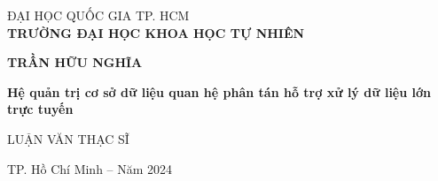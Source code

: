 \documentclass[14pt]{article}
\begin{document}
   
    




    \begin{mdframed}[linewidth=1pt, %
                     linecolor=black, %
                     leftmargin=0, %
                     rightmargin=0, %
                     innertopmargin=20mm, %
                     innerbottommargin=20mm, %
                     innerleftmargin=25mm, %
                     innerrightmargin=25mm, %
                     skipabove=0, %
                     skipbelow=0] %
    \centering
    \vspace*{1cm}
    
    \Large ĐẠI HỌC QUỐC GIA TP. HCM\\
    \vspace{0.25cm}
    \Large \textbf{TRƯỜNG ĐẠI HỌC KHOA HỌC TỰ NHIÊN}\\
    
    \vspace{3cm}
    
    \Large \textbf{TRẦN HỮU NGHĨA}\\
    
    \vspace{3cm}
    
     \textbf{ Hệ quản trị cơ sở dữ liệu quan hệ phân tán
hỗ trợ xử lý dữ liệu lớn trực tuyến}\\
    
    \vspace{3cm}
    
    \Large LUẬN VĂN THẠC SĨ\\
    
    \vfill
    
    TP. Hồ Chí Minh – Năm 2024
    \end{mdframed}

\pagebreak
\end{document}
